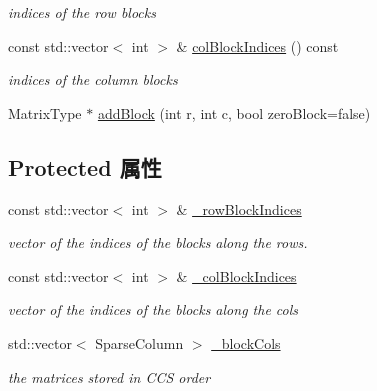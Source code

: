 \begin{DoxyCompactItemize}
\begin{DoxyCompactList}\small\item\em indices of the row blocks \end{DoxyCompactList}\item 
\hypertarget{classg2o_1_1SparseBlockMatrixHashMap_acc0352ad576ea5c5cebc76ba636ec481}{const std\-::vector$<$ int $>$ \& \hyperlink{classg2o_1_1SparseBlockMatrixHashMap_acc0352ad576ea5c5cebc76ba636ec481}{col\-Block\-Indices} () const }\label{classg2o_1_1SparseBlockMatrixHashMap_acc0352ad576ea5c5cebc76ba636ec481}

\begin{DoxyCompactList}\small\item\em indices of the column blocks \end{DoxyCompactList}\item 
Matrix\-Type $\ast$ \hyperlink{classg2o_1_1SparseBlockMatrixHashMap_a08330c47b1b60bbe008e3c4ee2f5150f}{add\-Block} (int r, int c, bool zero\-Block=false)
\end{DoxyCompactItemize}
\subsection*{Protected 属性}
\begin{DoxyCompactItemize}
\item 
\hypertarget{classg2o_1_1SparseBlockMatrixHashMap_ab002c32872fbce7d3485a5032eaee0de}{const std\-::vector$<$ int $>$ \& \hyperlink{classg2o_1_1SparseBlockMatrixHashMap_ab002c32872fbce7d3485a5032eaee0de}{\-\_\-row\-Block\-Indices}}\label{classg2o_1_1SparseBlockMatrixHashMap_ab002c32872fbce7d3485a5032eaee0de}

\begin{DoxyCompactList}\small\item\em vector of the indices of the blocks along the rows. \end{DoxyCompactList}\item 
\hypertarget{classg2o_1_1SparseBlockMatrixHashMap_a1def3b2ef5c5ee646d831cda7b1954be}{const std\-::vector$<$ int $>$ \& \hyperlink{classg2o_1_1SparseBlockMatrixHashMap_a1def3b2ef5c5ee646d831cda7b1954be}{\-\_\-col\-Block\-Indices}}\label{classg2o_1_1SparseBlockMatrixHashMap_a1def3b2ef5c5ee646d831cda7b1954be}

\begin{DoxyCompactList}\small\item\em vector of the indices of the blocks along the cols \end{DoxyCompactList}\item 
\hypertarget{classg2o_1_1SparseBlockMatrixHashMap_ae54514ce47f9cf1e54455d1f0adceb23}{std\-::vector$<$ Sparse\-Column $>$ \hyperlink{classg2o_1_1SparseBlockMatrixHashMap_ae54514ce47f9cf1e54455d1f0adceb23}{\-\_\-block\-Cols}}\label{classg2o_1_1SparseBlockMatrixHashMap_ae54514ce47f9cf1e54455d1f0adceb23}

\begin{DoxyCompactList}\small\item\em the matrices stored in C\-C\-S order \end{DoxyCompactList}\end{DoxyCompactItemize}


